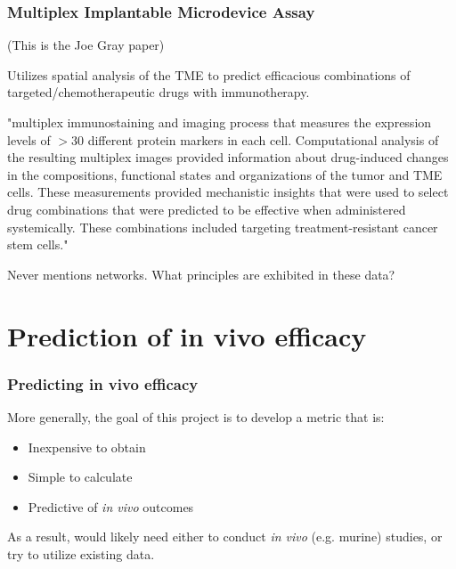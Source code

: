 \documentclass{beamer}
\begin{document}
\begin{frame}
  \frametitle{Multiplex Implantable Microdevice Assay}
  (This is the Joe Gray paper)

  Utilizes spatial analysis of the TME to predict efficacious combinations of targeted/chemotherapeutic drugs with immunotherapy.

  \vfill

  "multiplex immunostaining and imaging process that measures the expression levels of $>30$ different protein markers in each cell. Computational analysis of the resulting multiplex images provided information about drug-induced changes in the compositions, functional states and organizations of the tumor and TME cells. These measurements provided mechanistic insights that were used to select drug combinations that were predicted to be effective when administered systemically. These combinations included targeting treatment-resistant cancer stem cells."
  
  \vfill
  
  Never mentions networks. What principles are exhibited in these data? 
\end{frame}

\section{Prediction of in vivo efficacy}

\begin{frame}
  \frametitle{Predicting in vivo efficacy}
  More generally, the goal of this project is to develop a metric that is:
  \begin{itemize}
    \item Inexpensive to obtain
    \item Simple to calculate
    \item Predictive of \textit{in vivo} outcomes
  \end{itemize}

  As a result, would likely need either to conduct \textit{in vivo} (e.g. murine) studies, or try to utilize existing data. 
\end{frame}
\end{document}
